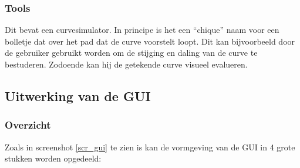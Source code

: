\documentclass[a4paper,11pt,oneside, titlepage]{article}
\begin{document}
\subsubsection{Tools}
Dit bevat een curvesimulator. In principe is het een ``chique'' naam voor een bolletje
dat over het pad dat de curve voorstelt loopt. Dit kan bijvoorbeeld door de gebruiker gebruikt worden om de stijging en daling
van de curve te bestuderen. Zodoende kan hij de getekende curve visueel evalueren.
\subsection{Uitwerking van de GUI}
\subsubsection{Overzicht}
Zoals in screenshot \ref{scr_gui} te zien is kan de vormgeving van de GUI in 4 grote stukken worden opgedeeld:
\end{document}
